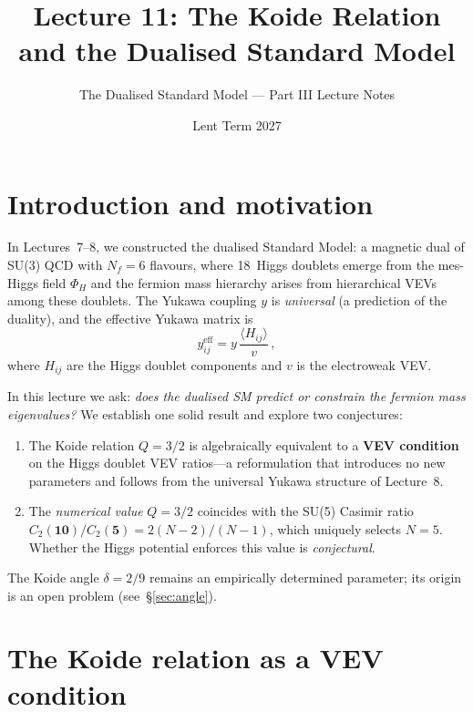 \documentclass[11pt,a4paper]{article}
\title{\textbf{Lecture 11: The Koide Relation and the Dualised
Standard Model}}
\author{The Dualised Standard Model --- Part III Lecture Notes}
\date{Lent Term 2027}
\newcommand{\Nf}{N_{\!f}}
\theoremstyle{definition}\newtheorem{exercise}{Exercise}[section]
\begin{document}
\maketitle

\tableofcontents
\newpage

\section{Introduction and motivation}
\label{sec:intro}

In Lectures~7--8, we constructed the dualised Standard Model: a
magnetic dual of SU(3) QCD with $\Nf = 6$ flavours, where 18~Higgs
doublets emerge from the mes-Higgs field $\Phi_H$ and the fermion
mass hierarchy arises from hierarchical VEVs among these doublets.
The Yukawa coupling $y$ is \emph{universal} (a prediction of the
duality), and the effective Yukawa matrix is
\begin{equation}
  y_{ij}^{\text{eff}} = y\,\frac{\langle H_{ij}\rangle}{v}\,,
  \label{eq:yeff}
\end{equation}
where $H_{ij}$ are the Higgs doublet components and $v$ is the
electroweak VEV.

In this lecture we ask: \emph{does the dualised SM predict or
constrain the fermion mass eigenvalues?}  We establish one solid
result and explore two conjectures:
\begin{enumerate}
\item[\textbf{(R)}] The Koide relation $Q = 3/2$ is algebraically
  equivalent to a \textbf{VEV condition} on the Higgs
  doublet VEV ratios---a reformulation that introduces no new
  parameters and follows from the universal Yukawa structure of
  Lecture~8.
\item[\textbf{(C1)}] The \emph{numerical value} $Q = 3/2$ coincides
  with the SU(5) Casimir ratio
  $C_2(\mathbf{10})/C_2(\mathbf{5}) = 2(N-2)/(N-1)$, which
  uniquely selects $N=5$.  Whether the Higgs potential enforces this
  value is \emph{conjectural}.
\end{enumerate}
The Koide angle $\delta = 2/9$ remains an empirically determined
parameter; its origin is an open problem (see~\S\ref{sec:angle}).

\section{The Koide relation as a VEV condition}
\label{sec:koide-vev}
\end{document}
